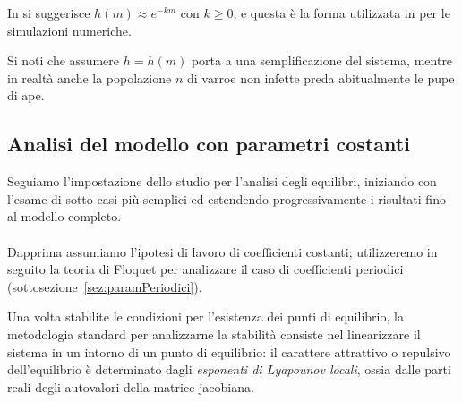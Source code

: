 In \cite{sumMar04} si suggerisce $h(m) \approx e^{-km}$ con $k\geq0$, e questa è la forma utilizzata in \cite{ratti2017} per le simulazioni numeriche.

Si noti che assumere $h=h(m)$ porta a una semplificazione del sistema, mentre in realtà anche la
popolazione $n$ di varroe non infette preda abitualmente le pupe di ape.


\subsection{Analisi del modello con parametri costanti}
Seguiamo l'impostazione dello studio \cite{ratti2017} per l'analisi degli equilibri, iniziando con l'esame di sotto-casi più semplici ed estendendo progressivamente i risultati fino al modello completo.

\paragraph{}
Dapprima assumiamo l'ipotesi di lavoro di coefficienti costanti; utilizzeremo in seguito la teoria di Floquet per analizzare il caso di coefficienti periodici (sottosezione~\ref{sez:paramPeriodici}).

Una volta stabilite le condizioni per l'esistenza dei punti di equilibrio, la metodologia standard per analizzarne la stabilità consiste nel linearizzare il sistema in un intorno di un punto di equilibrio: il carattere attrattivo o repulsivo dell'equilibrio è determinato dagli \emph{esponenti di Lyapounov locali}, ossia dalle parti reali degli autovalori della matrice jacobiana.

